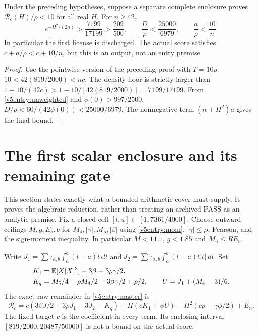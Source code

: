 \begin{lemma}\label{v5entry:ten}
Under the preceding hypotheses, suppose a separate complete enclosure
proves $\mathcal R_c(H)/\rho<10$ for all real $H$. For $n\ge42$,
\[
 e^{-H^2/(2n)}>\frac{7199}{17199}>\frac{209}{500},\qquad
 \frac D\rho<\frac{25000}{6979},\qquad
 \frac a\rho<\frac{10}{n}.
\]
In particular the first license is discharged. The actual score satisfies
$c+a/\rho<c+10/n$, but this is an output, not an entry premise.
\end{lemma}
\begin{proof}
Use the pointwise version of the preceding proof with $T=10\rho$:
$10<42(819/2000)<nc$. The density floor is strictly larger than
$1-10/(42c)>1-10/[42(819/2000)]=7199/17199$.
From \eqref{v5entry:unweighted} and $\phi(0)>997/2500$,
$D/\rho<60/(42\phi(0))<25000/6979$.
The nonnegative term $(n+H^2)a$ gives the final bound.
\end{proof}

\section{The first scalar enclosure and its remaining gate}
\label{v5entry:raw}
This section states exactly what a bounded arithmetic cover must supply.
It proves the algebraic reduction, rather than treating an archived PASS
as an analytic premise. Fix a closed cell $[l,u]\subset[1,7361/4000]$.
Choose outward ceilings $M,g,E_5,b$ for $M_4,|\gamma|,M_5,|\beta|$ using
\eqref{v5entry:mom}, $|\gamma|\le\rho$, Pearson, and the sign-moment
inequality. In particular $M<11.1$, $g<1.85$ and $M_6\le RE_5$.

Write $J_1=\sum\tau_{a,b}\int_a^b(t-a)t\,dt$ and
$J_2=\sum\tau_{a,b}\int_a^b(t-a)t|t|\,dt$. Set
\begin{align*}
 K_1&=\mathbb E[X|X|^3]-3\beta-3\rho\gamma/2,\\
 K_q&=M_5/4-\rho M_4/2-3\beta\gamma/2+\rho/2,
 \qquad U=J_1+(M_4-3)/6.
\end{align*}
The exact raw remainder in \eqref{v5entry:master} is
\[
 \mathcal R_c=c(3\beta J/2+3\rho J_1-3J_2-K_q)
       +H(cK_1+\phi U)-H^2(c\rho+\gamma\phi/2)+E_n.
\]
The fixed target $c$ is the coefficient in every term. Its enclosing
interval $[819/2000,20487/50000]$ is not a bound on the actual score.

